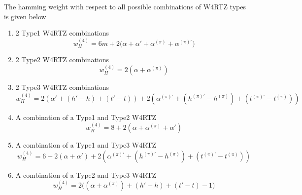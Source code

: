 \documentclass[11pt, oneside, dvipdfmx]{book}
\begin{document}
The hamming weight with respect to all possible combinations of W4RTZ types is given below

\begin{enumerate}
\item 2 Type1 W4RTZ combinations
\begin{equation}
w_H^{(4)} = 6m+2\Big(\alpha+\alpha' +\alpha^{(\pi)} +\alpha^{(\pi)'}\Big)
\end{equation}

\item 2 Type2 W4RTZ combinations
\begin{equation}
w_H^{(4)} = 2(\alpha + \alpha^{(\pi)})
\end{equation}

\item 2 Type3 W4RTZ combinations
\begin{equation}
w_H^{(4)} =2(\alpha' +(h'-h) +(t'-t)) + 2(\alpha^{(\pi)'} +(h^{(\pi)'}-h^{(\pi)}) 
+(t^{(\pi)'}-t^{(\pi)}))
\end{equation}

\item A combination of a Type1 and Type2 W4RTZ
\begin{equation}
w_H^{(4)} =8+2(\alpha + \alpha^{(\pi)} + \alpha')
\end{equation}

\item A combination of a Type1 and Type3 W4RTZ
\begin{equation}
w_H^{(4)} =6+2(\alpha + \alpha')+2(\alpha^{(\pi)'} +(h^{(\pi)'}-h^{(\pi)}) 
+(t^{(\pi)'}-t^{(\pi)}))
\end{equation}

\item A combination of a Type2 and Type3 W4RTZ
\begin{equation}
w_H^{(4)} =2\Big((\alpha + \alpha^{(\pi)})+(h'-h)+(t'-t) - 1\Big)
\end{equation}

\end{enumerate}






\end{document}
